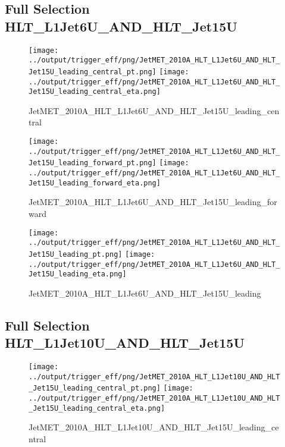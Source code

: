 \documentclass[11pt]{article}
\begin{document}
\newpage
\subsection{Full Selection HLT\_L1Jet6U\_AND\_HLT\_Jet15U}
\begin{figure}[ht]
\centering
\texttt{[image: ../output/trigger\_eff/png/JetMET\_2010A\_HLT\_L1Jet6U\_AND\_HLT\_Jet15U\_leading\_central\_pt.png]}
\texttt{[image: ../output/trigger\_eff/png/JetMET\_2010A\_HLT\_L1Jet6U\_AND\_HLT\_Jet15U\_leading\_central\_eta.png]}
\caption{JetMET\_2010A\_HLT\_L1Jet6U\_AND\_HLT\_Jet15U\_leading\_central}
\label{fig:jetmet_L1Jet6U_AND_HLT_Jet15U_leading_central}
\end{figure}

\begin{figure}[ht]
\centering
\texttt{[image: ../output/trigger\_eff/png/JetMET\_2010A\_HLT\_L1Jet6U\_AND\_HLT\_Jet15U\_leading\_forward\_pt.png]}
\texttt{[image: ../output/trigger\_eff/png/JetMET\_2010A\_HLT\_L1Jet6U\_AND\_HLT\_Jet15U\_leading\_forward\_eta.png]}
\caption{JetMET\_2010A\_HLT\_L1Jet6U\_AND\_HLT\_Jet15U\_leading\_forward}
\label{fig:jetmet_L1Jet6U_AND_HLT_Jet15U_leading_forward}
\end{figure}

\begin{figure}[ht]
\centering
\texttt{[image: ../output/trigger\_eff/png/JetMET\_2010A\_HLT\_L1Jet6U\_AND\_HLT\_Jet15U\_leading\_pt.png]}
\texttt{[image: ../output/trigger\_eff/png/JetMET\_2010A\_HLT\_L1Jet6U\_AND\_HLT\_Jet15U\_leading\_eta.png]}
\caption{JetMET\_2010A\_HLT\_L1Jet6U\_AND\_HLT\_Jet15U\_leading}
\label{fig:jetmet_L1Jet6U_AND_HLT_Jet15U_leading}
\end{figure}

\newpage
\subsection{Full Selection HLT\_L1Jet10U\_AND\_HLT\_Jet15U}
\begin{figure}[ht]
\centering
\texttt{[image: ../output/trigger\_eff/png/JetMET\_2010A\_HLT\_L1Jet10U\_AND\_HLT\_Jet15U\_leading\_central\_pt.png]}
\texttt{[image: ../output/trigger\_eff/png/JetMET\_2010A\_HLT\_L1Jet10U\_AND\_HLT\_Jet15U\_leading\_central\_eta.png]}
\caption{JetMET\_2010A\_HLT\_L1Jet10U\_AND\_HLT\_Jet15U\_leading\_central}
\label{fig:jetmet_L1Jet10U_AND_HLT_Jet15U_leading_central}
\end{figure}
\end{document}
